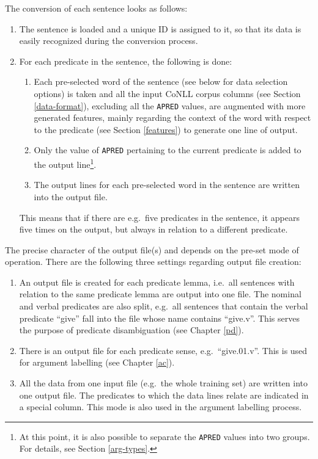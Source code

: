 \documentclass[12pt,notitlepage,a4paper]{report}
\begin{document}
The conversion of each sentence looks as follows:
\begin{enumerate}
    \item The sentence is loaded and a unique ID is assigned to it, so that its data is easily recognized during the conversion process.
    \item For each predicate in the sentence, the following is done:
    \begin{enumerate}
        \item Each pre-selected word of the sentence (see below for data selection options) is taken and all the input CoNLL corpus columns (see Section \ref{data-format}), excluding all the \texttt{APRED} values, are augmented with more generated features, mainly regarding the context of the word with respect to the predicate (see Section \ref{features}) to generate one line of output.
        \item Only the value of \texttt{APRED} pertaining to the current predicate is added to the output line\footnote{At this point, it is also possible to separate the \texttt{APRED} values into two groups. For details, see Section \ref{arg-types}.}.
        \item The output lines for each pre-selected word in the sentence are written into the output file.
    \end{enumerate}
    This means that if there are e.g.\ five predicates in the sentence, it appears five times on the output, but always in relation to a different predicate.
\end{enumerate}

The precise character of the output file(s) and depends on the pre-set mode of operation. There are the following three settings regarding output file creation:
\begin{enumerate}
    \item An output file is created for each predicate lemma, i.e.\ all sentences with relation to the same predicate lemma are output into one file. The nominal and verbal predicates are also split, e.g.\ all sentences that contain the verbal predicate ``give'' fall into the file whose name contains ``give.v''. This serves the purpose of predicate disambiguation (see Chapter \ref{pd}).
    \item There is an output file for each predicate sense, e.g.\ ``give.01.v''. This is used for argument labelling (see Chapter \ref{ac}).
    \item All the data from one input file (e.g.\ the whole training set) are written into one output file. The predicates to which the data lines relate are indicated in a special column. This mode is also used in the argument labelling process.
\end{enumerate}
\end{document}
